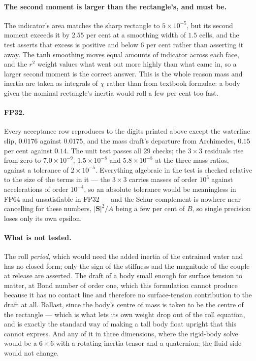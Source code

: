 \documentclass[11pt,a4paper]{article}
\newcommand{\e}[1]{\times 10^{#1}}
\begin{document}
\paragraph{The second moment is larger than the rectangle's, and must be.} The
indicator's area matches the sharp rectangle to $5\e{-5}$, but its second moment
exceeds it by $2.55$ per cent at a smoothing width of $1.5$ cells, and the test
asserts that excess is positive and below $6$ per cent rather than asserting it
away. The tanh smoothing moves equal amounts of indicator across each face, and
the $r^2$ weight values what went out more highly than what came in, so a larger
second moment is the correct answer. This is the whole reason mass and inertia
are taken as integrals of $\chi$ rather than from textbook formulae: a body given
the nominal rectangle's inertia would roll a few per cent too fast.

\paragraph{FP32.} Every acceptance row reproduces to the digits printed above
except the waterline slip, $0.0176$ against $0.0175$, and the mass draft's
departure from Archimedes, $0.15$ per cent against $0.14$. The unit test passes
all $29$ checks; the $3\times3$ residuals rise from zero to $7.0\e{-9}$,
$1.5\e{-8}$ and $5.8\e{-8}$ at the three mass ratios, against a tolerance of
$2\e{-5}$. Everything algebraic in the test is checked relative to the size of
the terms in it --- the $3\times3$ carries masses of order $10^5$ against
accelerations of order $10^{-4}$, so an absolute tolerance would be meaningless
in FP64 and unsatisfiable in FP32 --- and the Schur complement is nowhere near
cancelling for these numbers, $|\bm{S}|^2\!/A$ being a few per cent of $B$, so
single precision loses only its own epsilon.

\paragraph{What is not tested.} The roll \emph{period}, which would need the added
inertia of the entrained water and has no closed form; only the sign of the
stiffness and the magnitude of the couple at release are asserted. The draft of a
body small enough for surface tension to matter, at Bond number of order one,
which this formulation cannot produce because it has no contact line and
therefore no surface-tension contribution to the draft at all. Ballast, since the
body's centre of mass is taken to be the centre of the rectangle --- which is
what lets its own weight drop out of the roll equation, and is exactly the
standard way of making a tall body float upright that this cannot express. And
any of it in three dimensions, where the rigid-body solve would be a $6\times6$
with a rotating inertia tensor and a quaternion; the fluid side would not change.
\end{document}
